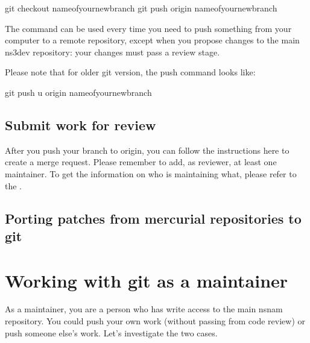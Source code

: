 \documentclass[letterpaper,10pt,english]{sphinxmanual}
\renewcommand{\sphinxcode}[1]{\texttt{\small{#1}}}
\begin{document}
\begin{sphinxVerbatim}[commandchars=\\\{\}]
\PYGZdl{} git checkout \PYG{o}{[}name\PYGZus{}of\PYGZus{}your\PYGZus{}new\PYGZus{}branch\PYG{o}{]}
\PYGZdl{} git push origin \PYG{o}{[}name\PYGZus{}of\PYGZus{}your\PYGZus{}new\PYGZus{}branch\PYG{o}{]}
\end{sphinxVerbatim}

The \sphinxcode{} command can be used every time you need to push something from your computer to a remote repository, except when you propose changes to the main ns\sphinxhyphen{}3\sphinxhyphen{}dev repository: your changes must pass a review stage.

Please note that for older git version, the push command looks like:

\begin{sphinxVerbatim}[commandchars=\\\{\}]
\PYGZdl{} git push \PYGZhy{}u origin \PYG{o}{[}name\PYGZus{}of\PYGZus{}your\PYGZus{}new\PYGZus{}branch\PYG{o}{]}
\end{sphinxVerbatim}


\section{Submit work for review}
\label{\detokenize{working-with-git:submit-work-for-review}}
After you push your branch to origin, you can follow the instructions here  to create a merge request. Please remember to add, as reviewer, at least one maintainer. To get the information on who is maintaining what, please refer to the .


\section{Porting patches from mercurial repositories to git}
\label{\detokenize{working-with-git:porting-patches-from-mercurial-repositories-to-git}}


\chapter{Working with git as a maintainer}
\label{\detokenize{working-with-git:working-with-git-as-a-maintainer}}
As a maintainer, you are a person who has write access to the main nsnam repository. You could push your own work (without passing from code review) or push someone else’s work. Let’s investigate the two cases.
\end{document}
